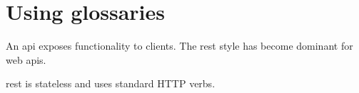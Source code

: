 \documentclass{article}
\begin{document}
\section{Using glossaries}

An \gls{api} exposes functionality to clients. The \gls{rest} style has become dominant for web \gls{api}s.

\gls{rest} is stateless and uses standard HTTP verbs.

\printglossaries
\end{document}
